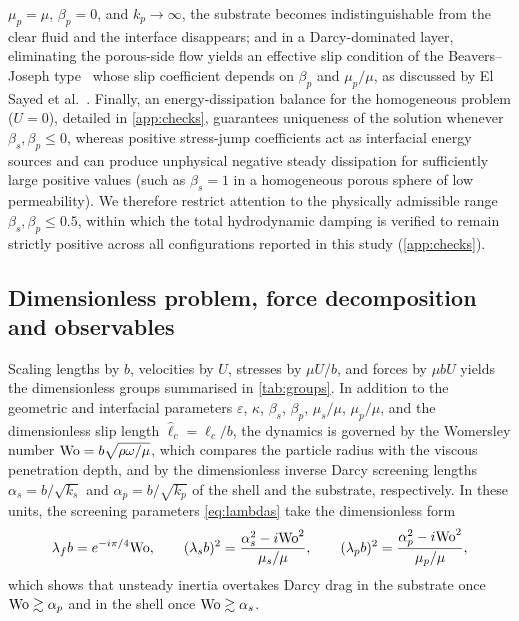 $\mu_p=\mu$, $\beta_p=0$, and $k_p\to\infty$, the substrate becomes indistinguishable from the clear fluid and the
interface disappears; and in a Darcy-dominated layer, eliminating the porous-side flow yields an effective slip condition
of the Beavers--Joseph type~\cite{beavers1967boundary} whose slip coefficient depends on $\beta_p$ and $\mu_p/\mu$, as
discussed by El Sayed et al.~\cite{elsayed2026effect}. Finally, an energy-dissipation balance for the homogeneous problem
($U=0$), detailed in \cref{app:checks}, guarantees uniqueness of the solution whenever $\beta_s,\beta_p\le0$, whereas
positive stress-jump coefficients act as interfacial energy sources and can produce unphysical negative steady
dissipation for sufficiently large positive values (such as $\beta_s=1$ in a homogeneous porous sphere of low
permeability). We therefore restrict attention to the physically admissible range $\beta_s,\beta_p\le0.5$, within which
the total hydrodynamic damping is verified to remain strictly positive across all configurations reported in this study
(\cref{app:checks}).

\subsection{Dimensionless problem, force decomposition and observables}\label{sec:nondim}
Scaling lengths by $b$, velocities by $U$, stresses by $\mu U/b$, and forces by $\mu bU$ yields the dimensionless groups
summarised in \cref{tab:groups}. In addition to the geometric and interfacial parameters $\varepsilon$, $\kappa$,
$\beta_s$, $\beta_p$, $\mu_s/\mu$, $\mu_p/\mu$, and the dimensionless slip length $\hat\ell_c=\ell_c/b$, the dynamics is
governed by the Womersley number $\mathrm{Wo}=b\sqrt{\rho\omega/\mu}$, which compares the particle radius with the viscous
penetration depth, and by the dimensionless inverse Darcy screening lengths $\alpha_s=b/\sqrt{k_s}$ and
$\alpha_p=b/\sqrt{k_p}$ of the shell and the substrate, respectively. In these units, the screening parameters
\cref{eq:lambdas} take the dimensionless form
\begin{equation}
  \lambda_fb=e^{-i\pi/4}\mathrm{Wo},\qquad
  (\lambda_sb)^2=\frac{\alpha_s^2-i\mathrm{Wo}^2}{\mu_s/\mu},\qquad
  (\lambda_pb)^2=\frac{\alpha_p^2-i\mathrm{Wo}^2}{\mu_p/\mu},
  \label{eq:lambdas_nd}
\end{equation}
which shows that unsteady inertia overtakes Darcy drag in the substrate once $\mathrm{Wo}\gtrsim\alpha_p$ and in the shell once
$\mathrm{Wo}\gtrsim\alpha_s$.

